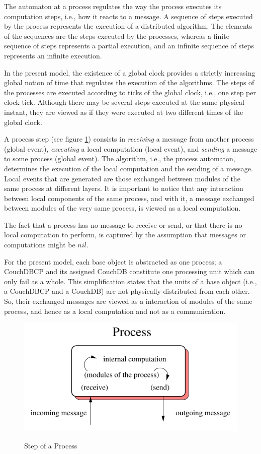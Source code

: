 The automaton at a process regulates the way the process executes its computation steps, i.e., how it reacts to a message. A sequence of steps executed by the process represents the execution of a distributed algorithm. The elements of the sequences are the steps executed by the processes, whereas a finite sequence of steps represents a partial execution, and an infinite sequence of steps represents an infinite execution.

In the present model, the existence of a global clock provides a strictly increasing global notion of time that regulates the execution of the algorithms. The steps of the processes are executed according to ticks of the global clock, i.e., one step per clock tick. Although there may be several steps executed at the same physical instant, they are viewed as if they were executed at two different times of the global clock.

A process step (see figure \ref{step_of_a_process}) consists in \emph{receiving} a message from another process (global event), \emph{executing} a local computation (local event), and \emph{sending} a message to some process (global event). The algorithm, i.e., the process automaton, determines the execution of the local computation and the sending of a message. Local events that are generated are those exchanged between modules of the same process at different layers. It is important to notice that any interaction between local components of the same process, and with it, a message exchanged between modules of the very same process, is viewed as a local computation.

The fact that a process has no message to receive or send, or that there is no local computation to perform, is captured by the assumption that messages or computations might be $nil$.

For the present model, each base object is abstracted as one process; a CouchDBCP and its assigned CouchDB constitute one processing unit which can only fail as a whole. This simplification states that the units of a base object (i.e., a CouchDBCP and a CouchDB) are not physically distributed from each other. So, their exchanged messages are viewed as a interaction of modules of the same process, and hence as a local computation and not as a communication.\\

\begin{figure}
    \centering
	{\includegraphics[width=150mm]{figures/step_of_a_process}}
    \caption{Step of a Process \cite[p.~27]{GR06}}
    \label{step_of_a_process}
\end{figure}

